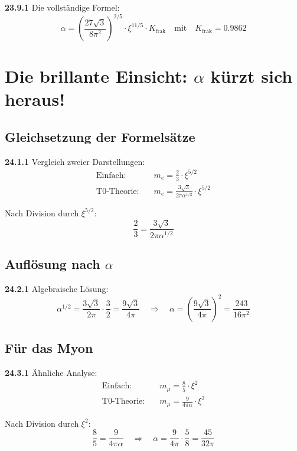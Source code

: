 \noindent \textbf{23.9.1} Die vollständige Formel:
\[
\boxed{
	\alpha = \left(\frac{27\sqrt{3}}{8\pi^2}\right)^{2/5} \cdot \xi^{11/5} \cdot K_{\text{frak}}
}
\quad \text{mit} \quad K_{\text{frak}} = 0.9862
\]	


\section{Die brillante Einsicht: $\alpha$ kürzt sich heraus!}

\subsection{Gleichsetzung der Formelsätze}

\noindent \textbf{24.1.1} Vergleich zweier Darstellungen:
\begin{align*}
	\text{Einfach:} &\quad m_e = \frac{2}{3} \cdot \xi^{5/2} \\
	\text{T0-Theorie:} &\quad m_e = \frac{3\sqrt{3}}{2\pi\alpha^{1/2}} \cdot \xi^{5/2}
\end{align*}

Nach Division durch $\xi^{5/2}$:
\[
\frac{2}{3} = \frac{3\sqrt{3}}{2\pi\alpha^{1/2}}
\]

\subsection{Auflösung nach $\alpha$}

\noindent \textbf{24.2.1} Algebraische Lösung:
\[
\alpha^{1/2} = \frac{3\sqrt{3}}{2\pi} \cdot \frac{3}{2} = \frac{9\sqrt{3}}{4\pi}
\quad \Rightarrow \quad
\alpha = \left(\frac{9\sqrt{3}}{4\pi}\right)^2 = \frac{243}{16\pi^2}
\]

\subsection{Für das Myon}

\noindent \textbf{24.3.1} Ähnliche Analyse:
\begin{align*}
	\text{Einfach:} &\quad m_\mu = \frac{8}{5} \cdot \xi^2 \\
	\text{T0-Theorie:} &\quad m_\mu = \frac{9}{4\pi\alpha} \cdot \xi^2
\end{align*}

Nach Division durch $\xi^2$:
\[
\frac{8}{5} = \frac{9}{4\pi\alpha}
\quad \Rightarrow \quad
\alpha = \frac{9}{4\pi} \cdot \frac{5}{8} = \frac{45}{32\pi}
\]

